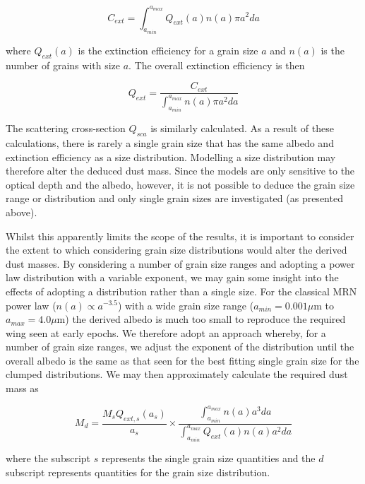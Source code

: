 \[ C_{ext}=\int^{a_{max}}_{a_{min}} Q_{ext}(a) n(a) \pi a^2 da \]

where $Q_{ext}(a)$ is the extinction efficiency for a grain size $a$ and $n(a)$ is the number of grains with size $a$. The overall extinction efficiency is then

\[ Q_{ext} = \frac{C_{ext}}{ \int^{a_{max}}_{a_{min}} n(a) \pi a^2 da} \]
 
The scattering cross-section $Q_{sca}$ is similarly calculated.  As a result of these calculations, there is rarely a single grain size that has the same albedo and extinction efficiency as a size distribution.  Modelling a size distribution may therefore alter the deduced dust mass.  Since the models are only sensitive to the optical depth and the albedo, however, it is not possible to deduce the grain size range or distribution and only single grain sizes are investigated (as presented above).

Whilst this apparently limits the scope of the results, it is important to consider the extent to which considering grain size distributions would alter the derived dust masses.  By considering a number of grain size ranges and adopting a power law distribution with a variable exponent, we may gain some insight into the effects of adopting a distribution rather than a single size.  For the classical MRN power law ($n(a) \propto a^{-3.5}$) with a wide grain size range ($a_{min} = 0.001 \mu$m to $a_{max} = 4.0 \mu$m) the derived albedo is much too small to reproduce the required wing seen at early epochs.  We therefore adopt an approach whereby, for a number of grain size ranges, we adjust the exponent of the distribution until the overall albedo is the same as that seen for the best fitting single grain size for the clumped distributions.  We may then approximately calculate the required dust mass as

\begin{equation}
\label{distn_conv}
M_{d}= \frac{M_s Q_{ext,s}(a_s)}{a_s} \times \frac{\int^{a_{max}}_{a_{min}} n(a) a^3 da}{\int^{a_{max}}_{a_{min}} Q_{ext}(a) n(a) a^2 da}
\end{equation}

where the subscript $s$ represents the single grain size quantities and the $d$ subscript represents quantities for the grain size distribution.  

